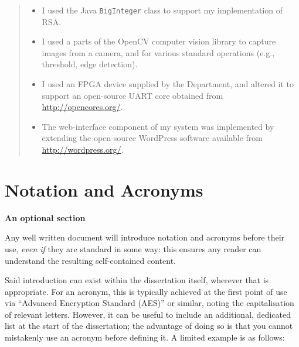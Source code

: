 \documentclass[oneside,%
                    author={Malak Hajji},
                    degree={BSc},
                    title={Designing An Accessible Computational Toolkit For Students},
                  subtitle={With Mixed Visual Abilities}]{dissertation}
\begin{document}
\begin{quote}
\noindent
\begin{itemize}
\item I used the Java {\tt BigInteger} class to support my implementation 
      of RSA.
\item I used a parts of the OpenCV computer vision library to capture 
      images from a camera, and for various standard operations (e.g., 
      threshold, edge detection).
\item I used an FPGA device supplied by the Department, and altered it 
      to support an open-source UART core obtained from 
      \url{http://opencores.org/}.
\item The web-interface component of my system was implemented by 
      extending the open-source WordPress software available from
      \url{http://wordpress.org/}.
\end{itemize}
\end{quote}


\chapter*{Notation and Acronyms}

{\bf An optional section}
\vspace{1cm} 

\noindent
Any well written document will introduce notation and acronyms before
their use, {\em even if} they are standard in some way: this ensures 
any reader can understand the resulting self-contained content.  

Said introduction can exist within the dissertation itself, wherever 
that is appropriate.  For an acronym, this is typically achieved at 
the first point of use via ``Advanced Encryption Standard (AES)'' or 
similar, noting the capitalisation of relevant letters.  However, it 
can be useful to include an additional, dedicated list at the start 
of the dissertation; the advantage of doing so is that you cannot 
mistakenly use an acronym before defining it.  A limited example is 
as follows:
\end{document}
